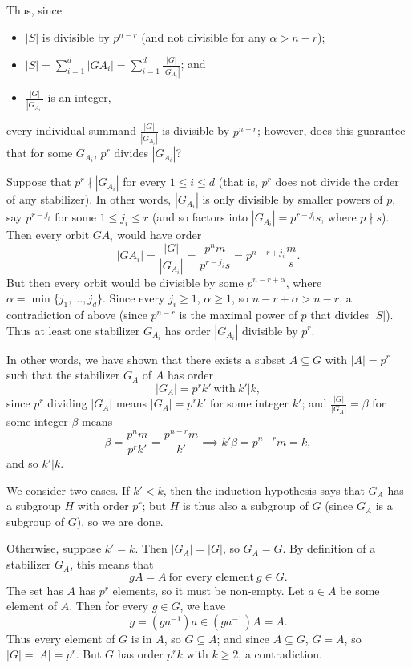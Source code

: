 \documentclass{homework}
\begin{document}
\begin{solution}
  Thus, since
  \begin{itemize}
    \item $\left| S \right| $ is divisible by $p^{n-r}$ (and not divisible for any $\alpha>n-r$);
    \item $\left| S \right| =\sum_{i=1}^{d} \left| GA_i \right| =\sum_{i=1}^{d} \frac{\left| G
      \right| }{\left| G_{A_i} \right| }$; and
    \item $\frac{\left| G \right| }{\left| G_{A_i} \right| }$ is an integer,
  \end{itemize}
  every individual summand $\frac{\left| G \right| }{\left| G_{A_i} \right| }$ is divisible by
  $p^{n-r}$; however, does this guarantee that for some $G_{A_i}$, $p^r$ divides $\left| G_{A_i}
  \right|$?

  Suppose that $p^r\nmid\left| G_{A_i} \right| $ for every $1\le i\le d$ (that is, $p^r$ does not
  divide the order of any stabilizer). In other words, $\left| G_{A_i} \right| $ is only divisible
  by smaller powers of $p$, say $p^{r-j_i}$ for some $1\le j_i\le r$ (and so factors into $\left|
  G_{A_i} \right| =p^{r-j_i}s$, where $p\nmid s$). Then every orbit $GA_i$ would have order \[
    \left| GA_i \right| =\frac{\left| G \right| }{\left| G_{A_i}
    \right|}=\frac{p^nm}{p^{r-j_i}s}=p^{n-r+j_i}\frac{m}{s}
  .\] But then every orbit would be divisible by some $p^{n-r+\alpha}$, where
  $\alpha=\min\{j_1,\ldots,j_d\}$. Since every $j_i\ge 1$, $\alpha\ge 1$, so $n-r+\alpha>n-r$, a
  contradiction of above (since $p^{n-r}$ is the maximal power of $p$ that divides $\left| S \right|
  $). Thus at least one stabilizer $G_{A_i}$ has order $\left| G_{A_i} \right|$ divisible by $p^r$.

  In other words, we have shown that there exists a subset $A\subseteq G$ with $\left| A \right|
  =p^r$ such that the stabilizer $G_A$ of $A$ has order \[
    \left| G_A \right| =p^rk' ~\text{with}~k'|k
  ,\] since $p^r$ dividing $\left| G_A \right| $ means $\left| G_A \right| =p^rk'$ for some
  integer $k'$; and $\frac{\left| G \right| }{\left| G_A \right| }=\beta$ for some integer
  $\beta$ means \[
    \beta=\frac{p^nm}{p^rk'}=\frac{p^{n-r}m}{k'}\implies k'\beta=p^{n-r}m=k
  ,\] and so $k'|k$.

  We consider two cases. If $k'<k$, then the induction hypothesis says that $G_A$ has a subgroup
  $H$ with order $p^r$; but $H$ is thus also a subgroup of $G$ (since $G_A$ is a subgroup of $G$),
  so we are done.

  Otherwise, suppose $k'=k$. Then $\left| G_A \right| =\left| G \right| $, so $G_A=G$. By definition
  of a stabilizer $G_A$, this means that \[
    gA=A~\text{for every element}~g\in G
  .\] The set has $A$ has $p^r$ elements, so it must be non-empty. Let $a\in A$ be some element of
  $A$. Then for every $g\in G$, we have \[
    g=(ga^{-1})a\in (ga^{-1})A=A
  .\] Thus every element of $G$ is in $A$, so $G\subseteq A$; and since $A\subseteq G$, $G=A$, so
  $\left| G \right| =\left| A \right| =p^r$. But $G$ has order $p^rk$ with $k\ge 2$, a
  contradiction.


\end{solution}
\end{document}
